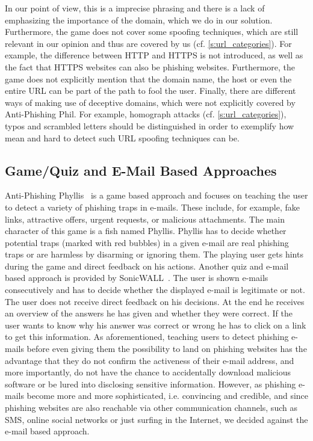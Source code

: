\begin{description}[leftmargin=0cm]
In our point of view, this is a imprecise phrasing and there is a lack of emphasizing the importance of the domain, which we do in our solution. 
Furthermore, the game does not cover some spoofing techniques, which are still relevant in our opinion and thus are covered by us (cf. \autoref{s:url_categories}). 
For example, the difference between HTTP and HTTPS is not introduced, as well as the fact that HTTPS websites can also be phishing websites. 
Furthermore, the game does not explicitly mention that the domain name, the host or even the entire URL can be part of the path to fool the user. 
Finally, there are different ways of making use of deceptive domains, which were not explicitly covered by Anti-Phishing Phil. 
For example, homograph attacks (cf. \autoref{s:url_categories}), typos and scrambled letters should be distinguished in order to exemplify how mean and hard to detect such URL spoofing techniques can be.
\end{description}


\subsection{Game/Quiz and E-Mail Based Approaches}
Anti-Phishing Phyllis~\cite{antiphishingphyllis} is a game based approach and focuses on teaching the user to detect a variety of phishing traps in e-mails. 
These include, for example, fake links, attractive offers, urgent requests, or malicious attachments. 
The main character of this game is a fish named Phyllis. 
Phyllis has to decide whether potential traps (marked with red bubbles) in a given e-mail are real phishing traps or are harmless by disarming or ignoring them. 
The playing user gets hints during the game and direct feedback on his actions. 
Another quiz and e-mail based approach is provided by SonicWALL~\cite{sonicwall}. 
The user is shown e-mails consecutively and has to decide whether the displayed e-mail is legitimate or not. 
The user does not receive direct feedback on his decisions. 
At the end he receives an overview of the answers he has given and whether they were correct. 
If the user wants to know why his answer was correct or wrong he has to click on a link to get this information. 
As aforementioned, teaching users to detect phishing e-mails before even giving them the possibility to land on phishing websites has the advantage that they do not confirm the activeness of their e-mail address, and more importantly, do not have the chance to accidentally download malicious software or be lured into disclosing sensitive information. 
However, as phishing e-mails become more and more sophisticated, i.e. convincing and credible, and since phishing websites are also reachable via other communication channels, such as SMS, online social networks or just surfing in the Internet, we decided against the e-mail based approach. 

